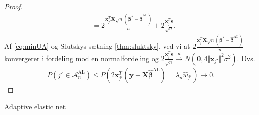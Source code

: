 \begin{proof}
\begin{align*}
&= 2 \frac{\mathbf{x}_{j'}^T \mathbf{X} \sqrt{n} \left(\boldsymbol{\beta}^*-\hat{\boldsymbol{\beta}}^{\text{AL}}\right)}{n}+2\frac{\mathbf{x}_{j'}^T \boldsymbol{\epsilon}}{\sqrt{n}}.
\end{align*}
Af \eqref{eq:minUA} og Slutskys sætning \ref{thm:sluktsky}, ved vi at $ 2 \frac{\mathbf{x}_{j'}^T \mathbf{X} \sqrt{n} \left(\boldsymbol{\beta}^*-\hat{\boldsymbol{\beta}}^{\text{AL}}\right)}{n}$ konvergerer i fordeling mod en normalfordeling og $2\frac{\mathbf{x}_{j'}^T \boldsymbol{\epsilon}}{\sqrt{n}} \overset{d}{\rightarrow} N \left(\mathbf{0}, 4 \Vert \mathbf{x}_{j'} \Vert^2 \sigma^2 \right)$. Dvs.
\begin{align*}
P\left(j' \in \mathcal{A}_n^{\text{AL}}\right) \leq P\left(2 \mathbf{x}_{j'}^T \left(\mathbf{y}-\mathbf{X} \hat{\boldsymbol{\beta}}^{\text{AL}}\right)=\lambda_n \hat{w}_{j'} \right) \rightarrow 0.
\end{align*}
\end{proof}


Adaptive elastic net
